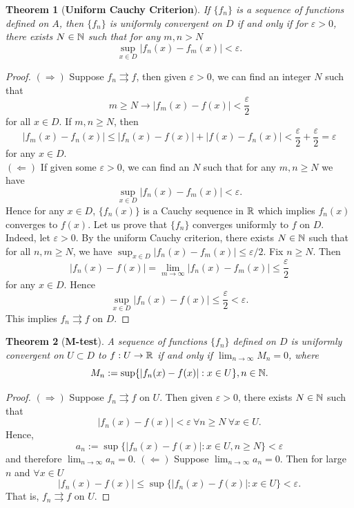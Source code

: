 \documentclass[	DIV=calc,paper=a4,fontsize=11pt]{scrartcl}	 	%
\newtheorem{thm}{Theorem}[section]
\theoremstyle{definition}
\theoremstyle{plain}
\theoremstyle{remark}
\begin{document}
\begin{thm}[\textbf{Uniform Cauchy Criterion}]
If $\{f_n\}$ is a sequence of functions defined on $A$, then $\{f_n\}$ is uniformly convergent on $D$ if and only if for $\varepsilon > 0$, there exists $N \in\Bbb N$ such that for any $m, n > N$
$$\sup_{x\in D}|f_n(x)-f_m(x)| < \varepsilon.$$
\end{thm}
\begin{proof}
$(\Rightarrow)$ Suppose $f_n\rightrightarrows f$, then given $\varepsilon > 0$, we can find an integer $N$ such that
\[m\ge N \rightarrow |f_m(x)-f(x)| < \frac{\varepsilon}{2}\]
for all $x\in D$. If $m, n\ge N$, then
\[|f_m(x)-f_n(x)| \le |f_n(x)-f(x)| + |f(x)-f_n(x)| < \frac{\varepsilon}{2}+\frac{\varepsilon}{2}=\varepsilon\]
for any $x \in D$.\\
$(\Leftarrow)$ If given some $\varepsilon > 0$, we can find an $N$ such that for any $m, n\ge N$ we have
\[\sup_{x\in D} |f_n(x)-f_m(x)| < \varepsilon.\]
Hence for any $x\in D$, $\{f_n(x)\}$ is a Cauchy sequence in $\Bbb R$ which implies $f_n(x)$ converges to $f(x)$. Let us prove that $\{f_n\}$ converges uniformly to $f$ on $D$. Indeed, let $\varepsilon > 0$. By the uniform Cauchy criterion, there exists $N\in \Bbb N$ such that for all $n, m\ge N$, we have $\sup_{x\in D} |f_n(x)-f_m(x)| \le \varepsilon/2$. Fix $n\ge N$. Then
\[|f_n(x)-f(x)| = \lim_{m\to\infty}|f_n(x)-f_m(x)|\le \frac{\varepsilon}{2}\]
for any $x\in D$. Hence
\[\sup_{x\in D}|f_n(x)-f(x)| \le \frac{\varepsilon}{2}< \varepsilon.\]
This implies $f_n\rightrightarrows f$ on $D$.
\end{proof}

\begin{thm}[\textbf{M-test}]
A sequence of functions $\{f_n\}$ defined on $D$ is uniformly convergent on $U\subset D$ to $f : U\to\Bbb R$ if and only if $\lim_{n\to\infty} M_n = 0$, where
$$M_n:=\sup\{|f_n(x)-f(x)| : x \in U\}, n \in\Bbb N.$$
\end{thm}
\begin{proof}
$(\Rightarrow)$ Suppose $f_n \rightrightarrows f$ on $U$. Then given $\varepsilon > 0$, there exists $N\in\Bbb N$ such that
\[|f_n(x)-f(x)| < \varepsilon\ \forall n\ge N\ \forall x\in U.\]
Hence,
\[a_n := \sup\{|f_n(x)-f(x)| : x\in U, n\ge N\} <\varepsilon\]
and therefore $\lim_{n\to\infty}a_n = 0$.
$(\Leftarrow)$ Suppose $\lim_{n\to\infty}a_n = 0$. Then for large $n$ and $\forall x\in U$
\[|f_n(x)-f(x)| \le \sup\{|f_n(x)-f(x)| : x\in U\} < \varepsilon.\]
That is, $f_n\rightrightarrows f$ on $U$.
\end{proof}
\end{document}
